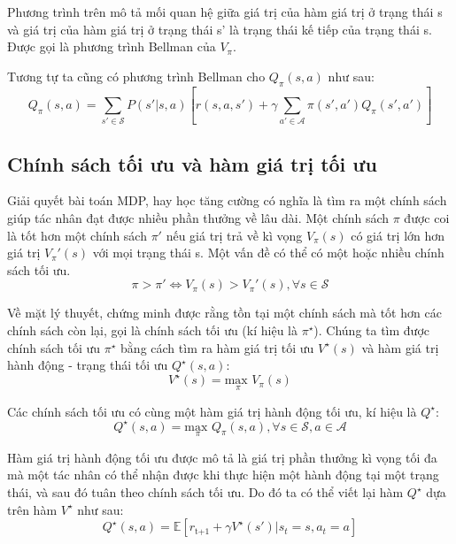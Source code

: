 \documentclass{uetgraduation}
\begin{document}
Phương trình trên mô tả mối quan hệ giữa giá trị của hàm giá trị ở trạng thái s và giá trị của hàm giá trị ở trạng thái s' là trạng thái kế tiếp của trạng thái s. Được gọi là phương trình Bellman
của $V_\pi$.

Tương tự ta cũng có phương trình Bellman cho $Q_\pi(s, a)$ như sau:
\begin{equation}
    Q_\pi(s, a) = \sum_{s' \in \mathcal{S}} P(s' | s, a) [r(s, a, s') + \gamma \sum_{a' \in \mathcal{A}} \pi(s', a') Q_\pi(s', a')]
    \label{eq:q_bellman}
\end{equation}

\subsection{Chính sách tối ưu và hàm giá trị tối ưu}
Giải quyết bài toán MDP, hay học tăng cường có nghĩa là tìm ra một chính sách giúp tác nhân đạt được nhiều phần thưởng về lâu dài. Một chính sách $\pi$ được coi là tốt hơn một chính sách $\pi'$ nếu giá
trị trả về kì vọng $V_\pi(s)$ có giá trị lớn hơn giá trị $V_\pi'(s)$ với mọi trạng thái s. Một vấn đề có thể có một hoặc nhiều chính sách tối ưu.
\begin{equation}
    \pi > \pi' \iff V_\pi(s) > V_\pi'(s), \forall s \in \mathcal{S}
    \label{eq:better_policy}
\end{equation}

Về mặt lý thuyết, chứng minh được rằng tồn tại một chính sách mà tốt hơn các chính sách còn lại, gọi là chính sách tối ưu (kí hiệu là $\pi^\star$). Chúng ta tìm được chính sách tối ưu $\pi^\star$ bằng
cách tìm ra hàm giá trị tối ưu $V^\star(s)$ và hàm giá trị hành động - trạng thái tối ưu $Q^\star (s, a)$:
\begin{equation}
    V^\star (s) = \underset{\pi}{\text{max }} V_\pi(s)
    \label{eq:v_optimal}
\end{equation}

Các chính sách tối ưu có cùng một hàm giá trị hành động tối ưu, kí hiệu là $Q^\star$:
\begin{equation}
    Q^\star (s, a) = \underset{\pi}{\text{max }} Q_\pi(s, a), \forall s \in \mathcal{S}, a \in \mathcal{A}
    \label{eq:q_optimal}
\end{equation}

Hàm giá trị hành động tối ưu được mô tả là giá trị phần thưởng kì vọng tối đa mà một tác nhân có thể nhận được khi thực hiện một hành động tại một trạng thái, và sau đó tuân theo chính sách tối ưu. Do đó ta có
thể viết lại hàm $Q^\star$ dựa trên hàm $V^\star$ như sau:
\begin{equation}
    Q^\star (s, a) = \mathbb{E} [r_\text{t+1} + \gamma V^\star (s') | s_t = s, a_t = a]
    \label{eq:q*_bellman_v*}
\end{equation}
\end{document}
